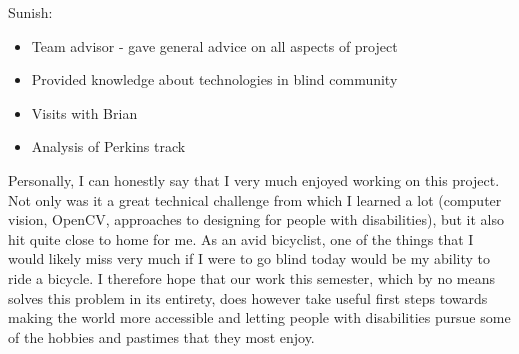 \documentclass[aps,twocolumn,secnumarabic,balancelastpage,amsmath,amssymb,nofootinbib]{revtex4-1}
\begin{document}
Sunish:
\begin{itemize}
\item Team advisor - gave general advice on all aspects of project
\item Provided knowledge about technologies in blind community
\item Visits with Brian 
\item Analysis of Perkins track
\end{itemize}

Personally, I can honestly say that I very much enjoyed working on this project. Not only was it a great technical challenge from which I learned a lot (computer vision, OpenCV, approaches to designing for people with disabilities), but it also hit quite close to home for me. As an avid bicyclist, one of the things that I would likely miss very much if I were to go blind today would be my ability to ride a bicycle. I therefore hope that our work this semester, which by no means solves this problem in its entirety, does however take useful first steps towards making the world more accessible and letting people with disabilities pursue some of the hobbies and pastimes that they most enjoy.
\end{document}
